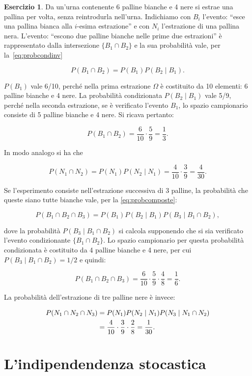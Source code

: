 \documentclass[
  11pt,
]{krantz}
\theoremstyle{definition}
\theoremstyle{definition}
\theoremstyle{definition}
\newtheorem{exercise}{Esercizio}[chapter]
\theoremstyle{definition}
\theoremstyle{remark}
\begin{document}
\begin{exercise}
Da un'urna contenente 6 palline bianche e 4 nere si estrae una pallina per volta, senza reintrodurla nell'urna. Indichiamo con \(B_i\) l'evento: ``esce una pallina bianca alla \(i\)-esima estrazione'' e con \(N_i\) l'estrazione di una pallina nera. L'evento: ``escono due palline bianche nelle prime due estrazioni'' è rappresentato dalla intersezione \(\{B_1 \cap B_2\}\) e la sua probabilità vale, per la~\eqref{eq:probcondinv}

\[
P(B_1 \cap B_2) = P(B_1)P(B_2 \mid B_1).
\]

\(P(B_1)\) vale 6/10, perché nella prima estrazione \(\Omega\) è costituito da 10 elementi: 6 palline bianche e 4 nere. La probabilità condizionata \(P(B_2 \mid B_1)\) vale 5/9, perché nella seconda estrazione, se è verificato l'evento \(B_1\), lo spazio campionario consiste di 5 palline bianche e 4 nere. Si ricava pertanto:

\[
P(B_1 \cap B_2) = \frac{6}{10} \cdot \frac{5}{9} = \frac{1}{3}.
\]

In modo analogo si ha che

\[
P(N_1 \cap N_2) = P(N_1)P(N_2 \mid N_1) = \frac{4}{10} \cdot \frac{3}{9} = \frac{4}{30}.
\]

Se l'esperimento consiste nell'estrazione successiva di 3 palline, la probabilità che queste siano tutte bianche vale, per la \eqref{eq:probcomposte}:

\[
P(B_1 \cap B_2 \cap B_3)=P(B_1)P(B_2 \mid B_1)P(B_3 \mid B_1 \cap B_2),
\]

dove la probabilità \(P(B_3 \mid B_1 \cap B_2)\) si calcola supponendo che si sia verificato l'evento condizionante \(\{B_1 \cap B_2\}\). Lo spazio campionario per questa probabilità condizionata è costituito da 4 palline bianche e 4 nere, per cui \(P(B_3 \mid B_1 \cap B_2) = 1/2\) e quindi:

\[
P (B_1 \cap B_2 \cap B_3) = \frac{6}{10}\cdot\frac{5}{9} \cdot\frac{4}{8}  = \frac{1}{6}.
\]

La probabilità dell'estrazione di tre palline nere è invece:

\[
\begin{aligned}
P(N_1 \cap N_2 \cap N_3) &= P(N_1)P(N_2 \mid N_1)P(N_3 \mid N_1 \cap N_2)\notag\\ 
&= \frac{4}{10} \cdot \frac{3}{9} \cdot \frac{2}{8} = \frac{1}{30}.\notag
\end{aligned}
\]
\end{exercise}

\hypertarget{lindipendendenza-stocastica}{%
\section{L'indipendendenza stocastica}\label{lindipendendenza-stocastica}}
\end{document}
